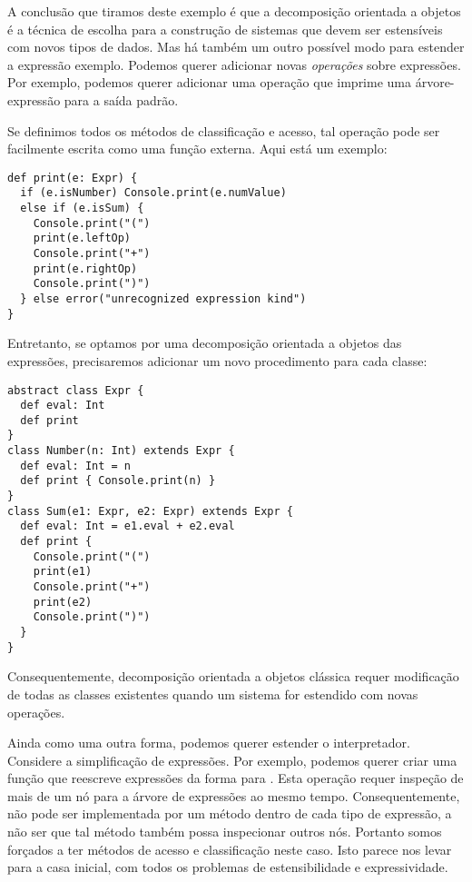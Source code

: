 A conclus\~{a}o que tiramos deste exemplo \'{e} que a decomposi\c{c}\~{a}o orientada a objetos
\'{e} a t\'{e}cnica de escolha para a constru\c{c}\~{a}o de sistemas que devem ser estens\'{i}veis
com novos tipos de dados. Mas h\'{a} tamb\'{e}m um outro poss\'{i}vel modo para estender a 
express\~{a}o exemplo. Podemos querer adicionar novas {\em opera\c{c}\~{o}es} sobre express\~{o}es.
Por exemplo, podemos querer adicionar uma opera\c{c}\~{a}o que imprime uma \'{a}rvore-express\~{a}o
para a sa\'{i}da padr\~{a}o.  

Se definimos todos os m\'{e}todos de classifica\c{c}\~{a}o e acesso, tal opera\c{c}\~{a}o pode ser 
facilmente escrita como uma fun\c{c}\~{a}o externa. Aqui est\'{a} um exemplo: 
\begin{lstlisting}
def print(e: Expr) {
  if (e.isNumber) Console.print(e.numValue)
  else if (e.isSum) {
    Console.print("(")
    print(e.leftOp)
    Console.print("+")
    print(e.rightOp)
    Console.print(")")
  } else error("unrecognized expression kind")
}
\end{lstlisting}

Entretanto, se optamos por uma decomposi\c{c}\~{a}o orientada a objetos das 
express\~{o}es, precisaremos adicionar um novo procedimento  
para cada classe: 
\begin{lstlisting}
abstract class Expr {
  def eval: Int
  def print
}
class Number(n: Int) extends Expr {
  def eval: Int = n
  def print { Console.print(n) }
}
class Sum(e1: Expr, e2: Expr) extends Expr {
  def eval: Int = e1.eval + e2.eval
  def print {
    Console.print("(")
    print(e1)
    Console.print("+")
    print(e2)
    Console.print(")")
  }
}
\end{lstlisting}

Consequentemente, decomposi\c{c}\~{a}o orientada a objetos cl\'{a}ssica requer modifica\c{c}\~{a}o 
de todas as classes existentes quando um sistema for estendido com novas
opera\c{c}\~{o}es.

Ainda como uma outra forma, podemos querer estender o interpretador. 
Considere a simplifica\c{c}\~{a}o de express\~{o}es. Por exemplo, podemos querer criar 
uma fun\c{c}\~{a}o que reescreve express\~{o}es da forma  para 
. Esta opera\c{c}\~{a}o requer inspe\c{c}\~{a}o de mais de um n\'{o} para a 
\'{a}rvore de express\~{o}es ao mesmo tempo. Consequentemente, n\~{a}o pode ser implementada
por um m\'{e}todo dentro de cada tipo de express\~{a}o, a n\~{a}o ser que tal m\'{e}todo tamb\'{e}m 
possa inspecionar outros n\'{o}s. Portanto somos for\c{c}ados a ter m\'{e}todos de acesso e 
classifica\c{c}\~{a}o neste caso. Isto parece nos levar para a casa inicial, com todos os 
problemas de estensibilidade e expressividade.

